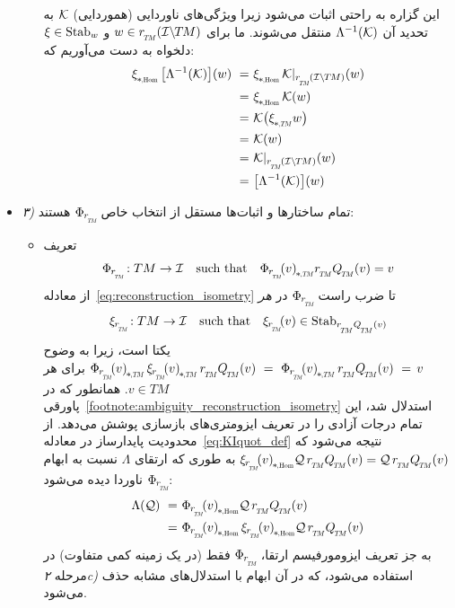 \begin{itemize}[leftmargin=0cm]
\begin{itemize}[leftmargin=1.1cm]
		این گزاره به راحتی اثبات می‌شود زیرا ویژگی‌های ناوردایی (هموردایی) $\mathcal{K}$ به تحدید آن $\Lambda^{-1}(\mathcal{K})$ منتقل می‌شوند.
		ما برای $w\in \rTM(\ITM)$ و $\xi\in \operatorname{Stab}_{w}$ دلخواه به دست می‌آوریم که:
		\begin{align}
			\dxiHom \big[\Lambda^{-1}(\K)\big](w)
			\ =&\ \dxiHom \Krestr (w) \notag \\
			\ =&\ \dxiHom \K(w) \notag \\
			\ =&\ \K \big(\dxiTM w\big) \notag \\
			\ =&\ \K(w) \notag \\
			\ =&\ \Krestr(w) \notag \\
			\ =&\ \big[\Lambda^{-1}(\K)\big](w)
		\end{align}
		
	\end{itemize}
	
	
	
	
	
	
	
	
	
	
	\item[] {\emph{۳)} تمام ساختارها و اثبات‌ها مستقل از انتخاب خاص $\PhirNoArg$ هستند: }
	\begin{itemize}[leftmargin=1.1cm]
		\setlength\itemsep{2ex}
		\item[]%
		تعریف
		\begin{align}
			\PhirNoArg: TM \to \I \quad \textup{such that}\quad \dPhirTM{v} \rTM \QTM(v) = v
		\end{align}
		از معادله~\eqref{eq:reconstruction_isometry} تا ضرب راست $\PhirNoArg$ در \emph{هر}
		\begin{align}
			\xirNoArg: TM \to \I \quad \textup{such that}\quad \xir{v} \in \Stab{\rTM\QTM(v)}
		\end{align}
		یکتا است، زیرا به وضوح $\dPhirTM{v}\, \dxirTM{v}\, \rTM\QTM(v)\ =\ \dPhirTM{v}\, \rTM\QTM(v)\ =\, v\,$ برای هر $v\in TM$.
		همانطور که در پاورقی~\ref{footnote:ambiguity_reconstruction_isometry} استدلال شد، این تمام درجات آزادی را در تعریف ایزومتری‌های بازسازی پوشش می‌دهد.
		از محدودیت پایدارساز در معادله~\eqref{eq:KIquot_def} نتیجه می‌شود که $\dxirHom{v} \Q\, \rTM\QTM(v) = \Q\, \rTM\QTM(v)$ به طوری که ارتقای $\Lambda$ نسبت به ابهام $\PhirNoArg$ ناوردا دیده می‌شود:
		\begin{align}
			\Lambda(\Q)
			\ =&\ \dPhirHom{v} \Q\, \rTM\QTM(v) \notag \\
			\ =&\ \dPhirHom{v}\, \dxirHom{v} \Q\, \rTM\QTM(v) \notag \\
		\end{align}
		به جز تعریف ایزومورفیسم ارتقا، $\PhirNoArg$ فقط (در یک زمینه کمی متفاوت) در مرحله \textit{۲c)} استفاده می‌شود، که در آن ابهام با استدلال‌های مشابه حذف می‌شود.
		
	\end{itemize}
	
\end{itemize}


